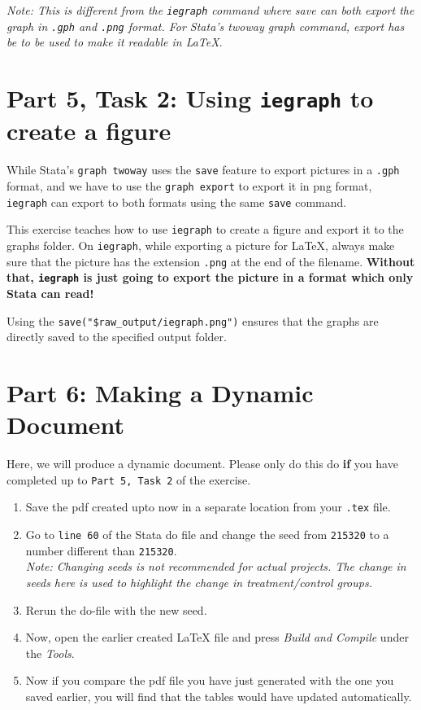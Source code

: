 \documentclass[]{article}
\begin{document}
\textit{Note: This is different from the \texttt{iegraph} command where save can both export the graph in \texttt{.gph} and \texttt{.png} format. For Stata's twoway graph command, export has be to be used to make it readable in {\LaTeX}}. 

\section*{Part 5, Task 2: Using \texttt{iegraph} to create a figure}

While Stata's \texttt{graph twoway} uses the \texttt{save} feature to export pictures in a \texttt{.gph} format, and we have to use the \texttt{graph export} to export it in png format, \texttt{iegraph} can export to both formats using the same \texttt{save} command. 

This exercise teaches how to use \texttt{iegraph} to create a figure and export it to the graphs folder. On \texttt{iegraph}, while exporting a picture for {\LaTeX}, always make sure that the picture has the extension \texttt{.png} at the end of the filename. \textbf{Without that, \texttt{iegraph} is just going to export the picture in a format which only Stata can read!}

Using the \verb|save("$raw_output/iegraph.png")| ensures that the graphs are directly saved to the specified output folder. 



\section*{Part 6: Making a Dynamic Document }

Here, we will produce a dynamic document. Please only do this do \textbf{if} you have completed up to \texttt{Part 5, Task 2} of the exercise. 

\begin{enumerate}
	\item Save the pdf created upto now in a separate location from your \texttt{.tex} file.
	\item Go to \texttt{line 60} of the Stata do file and change the seed from \texttt{215320} to a number different than \texttt{215320}.\\ \textit{Note: Changing seeds is not recommended for actual projects. The change in seeds here is used to highlight the change in treatment/control groups.}
	\item Rerun the do-file with the new seed.
	\item Now, open the earlier created {\LaTeX} file and press \textit{Build and Compile} under the \textit{Tools}.
	\item Now if you compare the pdf file you have just generated with the one you saved earlier, you will find that the tables would have updated automatically. 
\end{enumerate}
\end{document}
